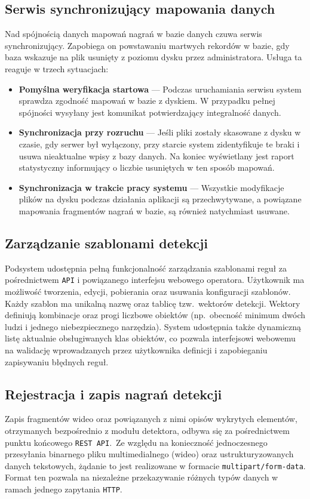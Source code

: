 \subsection{Serwis synchronizujący mapowania danych}
Nad spójnością danych mapowań nagrań w bazie danych czuwa serwis synchronizujący. 
Zapobiega on powstawaniu martwych rekordów w bazie, gdy baza wskazuje na plik usunięty z poziomu dysku przez administratora. 
Usługa ta reaguje w trzech sytuacjach:
\begin{itemize}
    \item \textbf{Pomyślna weryfikacja startowa} --- Podczas uruchamiania serwisu system sprawdza zgodność mapowań w bazie z dyskiem. W przypadku pełnej spójności wysyłany jest komunikat potwierdzający integralność danych.
    \item \textbf{Synchronizacja przy rozruchu} --- Jeśli pliki zostały skasowane z dysku w czasie, gdy serwer był wyłączony, przy starcie system zidentyfikuje te braki i usuwa nieaktualne wpisy z bazy danych. Na koniec wyświetlany jest raport statystyczny informujący o liczbie usuniętych w ten sposób mapowań.
    \item \textbf{Synchronizacja w trakcie pracy systemu} --- Wszystkie modyfikacje plików na dysku podczas działania aplikacji są przechwytywane, a powiązane mapowania fragmentów nagrań w bazie, są również natychmiast usuwane.
\end{itemize}

\subsection{Zarządzanie szablonami detekcji}
Podsystem udostępnia pełną funkcjonalność zarządzania szablonami reguł za pośrednictwem \texttt{API} 
i powiązanego interfejsu webowego operatora. Użytkownik ma możliwość tworzenia, edycji, pobierania 
oraz usuwania konfiguracji szablonów. Każdy szablon ma unikalną nazwę oraz tablicę 
tzw.\ wektorów detekcji. Wektory definiują kombinacje oraz progi liczbowe obiektów 
(np.\ obecność minimum dwóch ludzi i jednego niebezpiecznego narzędzia). 
System udostępnia także dynamiczną listę aktualnie obsługiwanych klas obiektów, co pozwala 
interfejsowi webowemu na walidację wprowadzanych przez użytkownika definicji i zapobieganiu 
zapisywaniu błędnych reguł.

\subsection{Rejestracja i zapis nagrań detekcji}
Zapis fragmentów wideo oraz powiązanych z nimi opisów wykrytych elementów, otrzymanych 
bezpośrednio z modułu detektora, odbywa się za pośrednictwem punktu końcowego \texttt{REST API}.\
Ze względu na konieczność jednoczesnego przesyłania binarnego pliku multimedialnego (wideo) 
oraz ustrukturyzowanych danych tekstowych, żądanie to jest realizowane w formacie 
\texttt{multipart/form-data}. Format ten pozwala na niezależne przekazywanie różnych typów 
danych w ramach jednego zapytania \texttt{HTTP}.\

